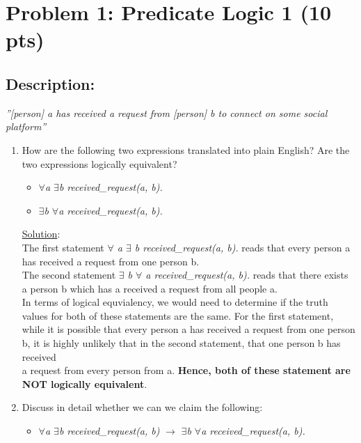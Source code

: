 

\section{Problem 1: Predicate Logic 1 (10 pts)}
\subsection{Description:}


\noident \textit{''[person] a has received a request from [person] b to connect on some social platform''}

\begin{enumerate}
  \item How are the following two expressions translated into plain English? Are the two
  expressions logically equivalent?
    \begin{itemize}
      \item \emph{$\forall$a $\exists$b received\_request(a, b).}
      \item \emph{$\exists$b $\forall$a received\_request(a, b).}
    
    \end{itemize}

    \noindent \underline{Solution}:\\ The first statement \emph{$\forall$ a $\exists$ b received\_request(a, b).} reads that every person a has received a request from one person b.\\
    The second statement \emph{$\exists$ b $\forall$ a received\_request(a, b).} reads that there exists a person b which has a received a request from all people a.\\
    In terms of logical equvialency, we would need to determine if the truth values for both of these statements are the same. For the first statement, \\ 
    while it is possible that every person a has received a request from one person b, it is highly unlikely that in the second statement, that one person b has received \\ 
    a request from every person from a. \textbf{Hence, both of these statement are NOT logically equivalent}. \\
         
  
  \item  Discuss in detail whether we can we claim the following:\
    \begin{itemize}
      \item[] \emph{$\forall$a $\exists$b received\_request(a, b)} $\rightarrow$ \emph{$\exists$b $\forall$a received\_request(a, b).}
    \end{itemize}


\end{enumerate}
